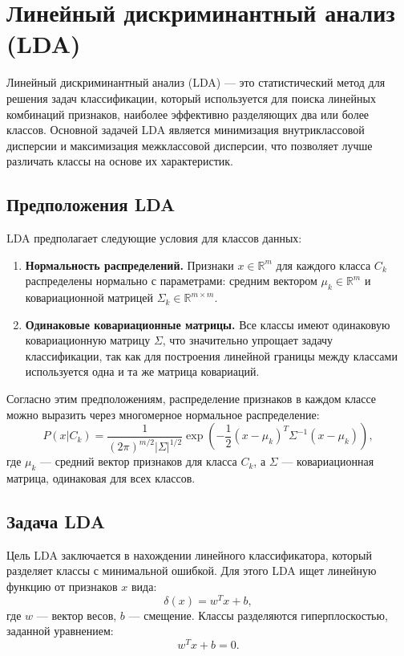 \section*{Линейный дискриминантный анализ (LDA)}

Линейный дискриминантный анализ (LDA) — это статистический метод для решения задач классификации, который используется для поиска линейных комбинаций признаков, наиболее эффективно разделяющих два или более классов. Основной задачей LDA является минимизация внутриклассовой дисперсии и максимизация межклассовой дисперсии, что позволяет лучше различать классы на основе их характеристик.

\subsection*{Предположения LDA}

LDA предполагает следующие условия для классов данных:
\begin{enumerate}
    \item \textbf{Нормальность распределений.} Признаки \( x \in \mathbb{R}^m \) для каждого класса \( C_k \) распределены нормально с параметрами: средним вектором \( \mu_k \in \mathbb{R}^m \) и ковариационной матрицей \( \Sigma_k \in \mathbb{R}^{m \times m} \).
    \item \textbf{Одинаковые ковариационные матрицы.} Все классы имеют одинаковую ковариационную матрицу \( \Sigma \), что значительно упрощает задачу классификации, так как для построения линейной границы между классами используется одна и та же матрица ковариаций.
\end{enumerate}

Согласно этим предположениям, распределение признаков в каждом классе можно выразить через многомерное нормальное распределение:
\[
P(x | C_k) = \frac{1}{(2\pi)^{m/2} |\Sigma|^{1/2}} \exp\left( -\frac{1}{2} (x - \mu_k)^T \Sigma^{-1} (x - \mu_k) \right),
\]
где \( \mu_k \) — средний вектор признаков для класса \( C_k \), а \( \Sigma \) — ковариационная матрица, одинаковая для всех классов.

\subsection*{Задача LDA}

Цель LDA заключается в нахождении линейного классификатора, который разделяет классы с минимальной ошибкой. Для этого LDA ищет линейную функцию от признаков \( x \) вида:
\[
\delta(x) = w^T x + b,
\]
где \( w \) — вектор весов, \( b \) — смещение. Классы разделяются гиперплоскостью, заданной уравнением:
\[
w^T x + b = 0.
\]

